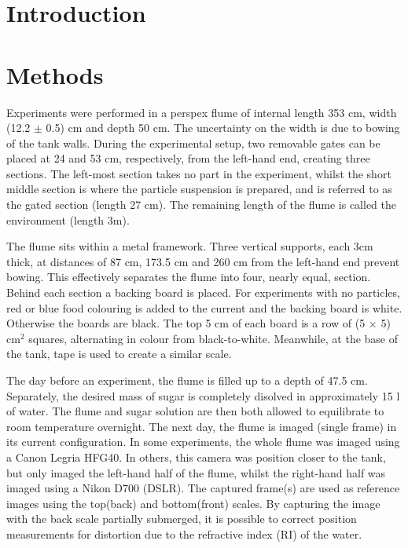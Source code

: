 \documentclass[authoryear,preprint,review,12pt]{elsarticle}
\begin{document}
\begin{frontmatter}
\begin{keyword}



\end{keyword}

\end{frontmatter}


\section{Introduction}
\label{sec:intro}

\section{Methods}
\label{sec:method}

Experiments were performed in a perspex flume of internal length 353 cm, width (12.2 $\pm$ 0.5) cm and depth 50 cm. The uncertainty on the width is due to bowing of the tank walls. During the experimental setup, two removable gates can be placed at 24 and 53 cm, respectively, from the left-hand end, creating three sections. The left-most section takes no part in the experiment, whilst the short middle section is where the particle suspension is prepared, and is referred to as the gated section (length 27 cm). The remaining length of the flume is called the environment (length 3m).

The flume sits within a metal framework. Three vertical supports, each 3cm thick, at distances of 87 cm, 173.5 cm and 260 cm from the left-hand end prevent bowing. This effectively separates the flume into four, nearly equal, section. Behind each section a backing board is placed. For experiments with no particles, red or blue food colouring is added to the current and the backing board is white. Otherwise the boards are black. The top 5 cm of each board is a row of (5 $\times$ 5) cm$^{2}$ squares, alternating in colour from black-to-white. Meanwhile, at the base of the tank, tape is used to create a similar scale.

The day before an experiment, the flume is filled up to a depth of 47.5 cm. Separately, the desired mass of sugar is completely disolved in approximately 15 l of water. The flume and sugar solution are then both allowed to equilibrate to room temperature overnight. The next day, the flume is imaged (single frame) in its current configuration. In some experiments, the whole flume was imaged using a Canon Legria HFG40. In others, this camera was position closer to the tank, but only imaged the left-hand half of the flume, whilst the right-hand half was imaged using a Nikon D700 (DSLR). The captured frame(s) are used as reference images using the top(back) and bottom(front) scales. By capturing the image with the back scale partially submerged, it is possible to correct position measurements for distortion due to the refractive index (RI) of the water.
\end{document}
